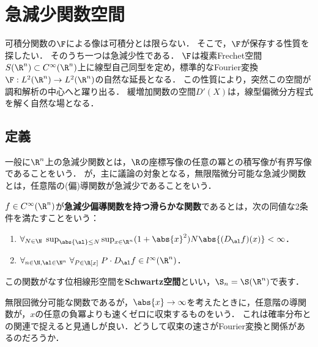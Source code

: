 \documentclass[uplatex,dvipdfmx]{jsreport}
\begin{document}
\section{急減少関数空間}

\begin{tcolorbox}[colframe=ForestGreen, colback=ForestGreen!10!white,breakable,colbacktitle=ForestGreen!40!white,coltitle=black,fonttitle=\bfseries\sffamily,
title=]
    可積分関数の$\F$による像は可積分とは限らない．
    そこで，$\F$が保存する性質を探したい．
    そのうち一つは急減少性である．
    $\F$は複素Frechet空間$S(\R^n)\subset C^\infty(\R^n)$上に線型自己同型を定め，標準的なFourier変換$\F:L^2(\R^n)\to L^2(\R^n)$の自然な延長となる．
    この性質により，突然この空間が調和解析の中心へと躍り出る．
    緩増加関数の空間$D'(X)$は，線型偏微分方程式を解く自然な場となる．
\end{tcolorbox}

\subsection{定義}

\begin{tcolorbox}[colframe=ForestGreen, colback=ForestGreen!10!white,breakable,colbacktitle=ForestGreen!40!white,coltitle=black,fonttitle=\bfseries\sffamily,
title=]
    一般に$\R^n$上の急減少関数とは，$\R$の座標写像の任意の冪との積写像が有界写像であることをいう．
    が，主に議論の対象となる，無限階微分可能な急減少関数とは，任意階の(偏)導関数が急減少であることをいう．
\end{tcolorbox}

\begin{definition}
    $f\in C^\infty(\R^n)$が\textbf{急減少偏導関数を持つ滑らかな関数}であるとは，次の同値な2条件を満たすことをいう：
    \begin{enumerate}
        \item $\forall_{N\in\N}\;\sup_{\abs{\al}\le N}\sup_{x\in\R^n}(1+\abs{x}^2)N\abs{(D_\al f)(x)}<\infty$．
        \item $\forall_{n\in\N,\al\in\N^n}\;\forall_{P\in\R[x]}\;P\cdot D_\al f\in l^\infty(\R^n)$．
    \end{enumerate}
    この関数がなす位相線形空間を\textbf{Schwartz空間}といい，$\S_n=\S(\R^n)$で表す．
\end{definition}
\begin{remarks}
    無限回微分可能な関数であるが，$\abs{x}\to\infty$を考えたときに，任意階の導関数が，$x$の任意の負冪よりも速くゼロに収束するものをいう．
    これは確率分布との関連で捉えると見通しが良い．どうして収束の速さがFourier変換と関係があるのだろうか．
\end{remarks}
\end{document}
